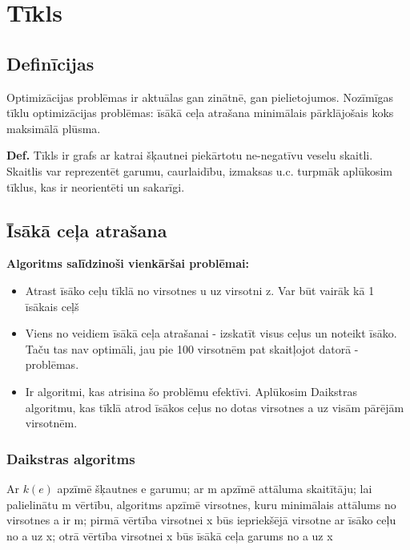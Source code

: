 \documentclass{article}
\begin{document}
\section{Tīkls}

\subsection{Definīcijas}
Optimizācijas problēmas ir aktuālas gan zinātnē, gan pielietojumos.  Nozīmīgas tīklu optimizācijas problēmas: īsākā ceļa atrašana minimālais pārklājošais koks maksimālā plūsma.

\textbf{Def.}  Tīkls ir grafs ar katrai šķautnei piekārtotu ne-negatīvu veselu skaitli.  Skaitlis var reprezentēt garumu, caurlaidību, izmaksas u.c.  turpmāk aplūkosim tīklus, kas ir neorientēti un sakarīgi.

\subsection{Īsākā ceļa atrašana}

\textbf{Algoritms salīdzinoši vienkāršai problēmai:}
\begin{itemize}
	\item Atrast īsāko ceļu tīklā no virsotnes u uz virsotni z. Var būt vairāk kā 1 īsākais ceļš
	\item Viens no veidiem īsākā ceļa atrašanai - izskatīt visus ceļus un noteikt īsāko. Taču tas nav optimāli, jau pie 100 virsotnēm pat skaitļojot datorā - problēmas.
	\item Ir algoritmi, kas atrisina šo problēmu efektīvi.  Aplūkosim Daikstras algoritmu, kas tīklā atrod īsākos ceļus no dotas virsotnes a uz visām pārējām virsotnēm.
\end{itemize}

\subsubsection{Daikstras algoritms}
Ar $k(e)$ apzīmē šķautnes e garumu; ar m apzīmē attāluma skaitītāju; lai palielinātu m vērtību, algoritms apzīmē virsotnes, kuru minimālais attālums no virsotnes a ir m; pirmā vērtība virsotnei x būs iepriekšējā virsotne ar īsāko ceļu no a uz x; otrā vērtība virsotnei x būs īsākā ceļa garums no a uz x
\end{document}
